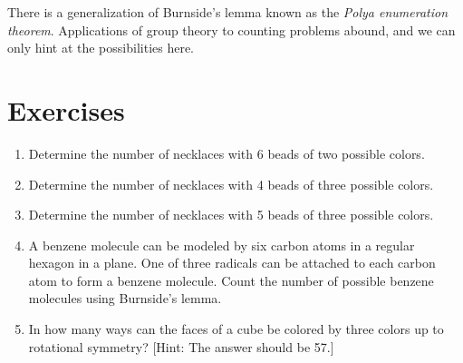 \documentclass[11pt,oneside]{article}
\newenvironment{problems}
{
 \begin{enumerate}[topsep=1pt,itemsep=0pt,parsep=2pt,leftmargin=0.6cm,%
 label={\arabic*.}, ref=\arabic*] \small
}
{
 \end{enumerate}
}
\theoremstyle{definition}
\begin{document}
There is a generalization of Burnside's lemma known as the \emph{Polya
  enumeration theorem}. Applications of group theory to counting
problems abound, and we can only hint at the possibilities here.


\section*{Exercises}
\begin{problems}

\item Determine the number of necklaces with 6 beads of two possible
  colors.

\item Determine the number of necklaces with 4 beads of three possible
  colors.

\item Determine the number of necklaces with 5 beads of three possible
  colors.

\item A benzene molecule can be modeled by six carbon atoms in a
  regular hexagon in a plane. One of three radicals can be attached to
  each carbon atom to form a benzene molecule. Count the number of
  possible benzene molecules using Burnside's lemma.

\item In how many ways can the faces of a cube be colored by three
  colors up to rotational symmetry? [Hint: The answer should be 57.]

\end{problems}
\end{document}

